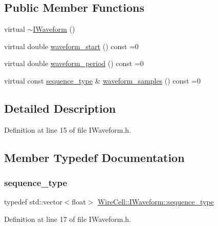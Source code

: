 \subsection*{Public Member Functions}
\begin{DoxyCompactItemize}
\item 
virtual \hyperlink{class_wire_cell_1_1_i_waveform_ab4787e8ab17e3d205b490dc29b2192ef}{$\sim$\+I\+Waveform} ()
\item 
virtual double \hyperlink{class_wire_cell_1_1_i_waveform_ac7dfdf92e835bf708838bcdc1ba91ba2}{waveform\+\_\+start} () const =0
\item 
virtual double \hyperlink{class_wire_cell_1_1_i_waveform_a0d5d0cd99b8a4e49d5d8b633150b707a}{waveform\+\_\+period} () const =0
\item 
virtual const \hyperlink{class_wire_cell_1_1_i_waveform_ad8f85e800ab8082ddbd89ac91164db7d}{sequence\+\_\+type} \& \hyperlink{class_wire_cell_1_1_i_waveform_a4901f7f36170f22c3e89ebd7939be4d0}{waveform\+\_\+samples} () const =0
\end{DoxyCompactItemize}


\subsection{Detailed Description}


Definition at line 15 of file I\+Waveform.\+h.



\subsection{Member Typedef Documentation}
\mbox{\label{class_wire_cell_1_1_i_waveform_ad8f85e800ab8082ddbd89ac91164db7d}} 
\subsubsection{\texorpdfstring{sequence\+\_\+type}{sequence\_type}}
{\footnotesize\ttfamily typedef std\+::vector$<$float$>$ \hyperlink{class_wire_cell_1_1_i_waveform_ad8f85e800ab8082ddbd89ac91164db7d}{Wire\+Cell\+::\+I\+Waveform\+::sequence\+\_\+type}}



Definition at line 17 of file I\+Waveform.\+h.



